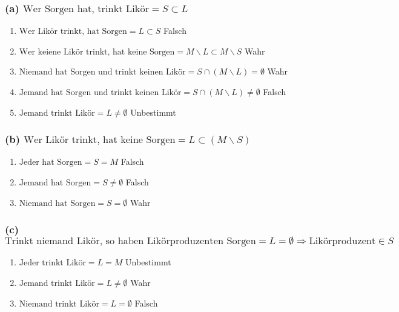 \documentclass{article}
\begin{document}
            \subsubsection*{(a) \(\text{Wer Sorgen hat, trinkt Likör} = S \subset L \)}
                \begin{enumerate}[label=(\roman*)]
                    \item \(\text{Wer Likör trinkt, hat Sorgen} = L \subset S\) Falsch
                    \item \(\text{Wer keiene Likör trinkt, hat keine Sorgen} = M \backslash L \subset M \backslash S\) Wahr
                    \item \(\text{Niemand hat Sorgen und trinkt keinen Likör} = S \cap (M \backslash L) = \emptyset\) Wahr
                    \item \(\text{Jemand hat Sorgen und trinkt keinen Likör} = S \cap (M \backslash L) \not= \emptyset\) Falsch
                    \item \(\text{Jemand trinkt Likör} = L \not= \emptyset\) Unbestimmt
                \end{enumerate}

            \subsubsection*{(b) \(\text{Wer Likör trinkt, hat keine Sorgen} = L \subset (M \backslash S)\)}
                \begin{enumerate}[label=(\roman*)]
                    \item \(\text{Jeder hat Sorgen} = S = M\) Falsch
                    \item \(\text{Jemand hat Sorgen} = S \neq \emptyset\) Falsch
                    \item \(\text{Niemand hat Sorgen} = S = \emptyset\) Wahr
                \end{enumerate}

            \subsubsection*{(c) \(\text{Trinkt niemand Likör, so haben Likörproduzenten Sorgen} = L = \emptyset \Rightarrow \text{Likörproduzent} \in S\)}
                \begin{enumerate}[label=(\roman*)]
                    \item \(\text{Jeder trinkt Likör} = L = M\) Unbestimmt
                    \item \(\text{Jemand trinkt Likör} = L \neq \emptyset\) Wahr
                    \item \(\text{Niemand trinkt Likör} = L = \emptyset\) Falsch
                \end{enumerate}
\end{document}

